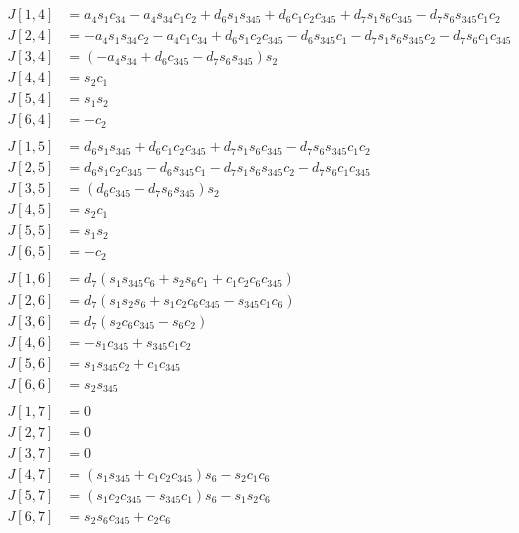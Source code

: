\documentclass[onecolumn,10pt]{jhwhw}
\begin{document}
\begin{align*}
\\
J[1,4] &= a_{4} s_{1} c_{34} - a_{4} s_{34} c_{1} c_{2} + d_{6} s_{1} s_{345} + d_{6} c_{1} c_{2} c_{345} + d_{7} s_{1} s_{6} c_{345} - d_{7} s_{6} s_{345} c_{1} c_{2} \\
J[2,4] &= - a_{4} s_{1} s_{34} c_{2} - a_{4} c_{1} c_{34} + d_{6} s_{1} c_{2} c_{345} - d_{6} s_{345} c_{1} - d_{7} s_{1} s_{6} s_{345} c_{2} - d_{7} s_{6} c_{1} c_{345} \\
J[3,4] &= \left(- a_{4} s_{34} + d_{6} c_{345} - d_{7} s_{6} s_{345}\right) s_{2} \\
J[4,4] &= s_{2} c_{1} \\
J[5,4] &= s_{1} s_{2} \\
J[6,4] &= - c_{2} \\
\\
J[1,5] &= d_{6} s_{1} s_{345} + d_{6} c_{1} c_{2} c_{345} + d_{7} s_{1} s_{6} c_{345} - d_{7} s_{6} s_{345} c_{1} c_{2} \\
J[2,5] &= d_{6} s_{1} c_{2} c_{345} - d_{6} s_{345} c_{1} - d_{7} s_{1} s_{6} s_{345} c_{2} - d_{7} s_{6} c_{1} c_{345} \\
J[3,5] &= \left(d_{6} c_{345} - d_{7} s_{6} s_{345}\right) s_{2} \\
J[4,5] &= s_{2} c_{1} \\
J[5,5] &= s_{1} s_{2} \\
J[6,5] &= - c_{2} \\
\\
J[1,6] &= d_{7} \left(s_{1} s_{345} c_{6} + s_{2} s_{6} c_{1} + c_{1} c_{2} c_{6} c_{345}\right) \\
J[2,6] &= d_{7} \left(s_{1} s_{2} s_{6} + s_{1} c_{2} c_{6} c_{345} - s_{345} c_{1} c_{6}\right) \\
J[3,6] &= d_{7} \left(s_{2} c_{6} c_{345} - s_{6} c_{2}\right) \\
J[4,6] &= - s_{1} c_{345} + s_{345} c_{1} c_{2} \\
J[5,6] &= s_{1} s_{345} c_{2} + c_{1} c_{345} \\
J[6,6] &= s_{2} s_{345} \\
\\
J[1,7] &= 0 \\
J[2,7] &= 0 \\
J[3,7] &= 0 \\
J[4,7] &= \left(s_{1} s_{345} + c_{1} c_{2} c_{345}\right) s_{6} - s_{2} c_{1} c_{6} \\
J[5,7] &= \left(s_{1} c_{2} c_{345} - s_{345} c_{1}\right) s_{6} - s_{1} s_{2} c_{6} \\
J[6,7] &= s_{2} s_{6} c_{345} + c_{2} c_{6} \\
\end{align*}
\end{document}
